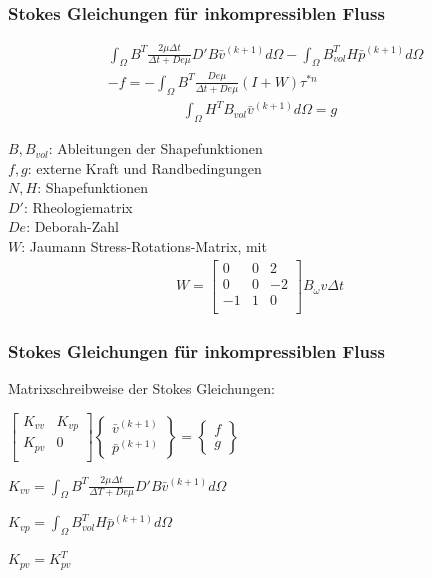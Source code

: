 \documentclass{beamer}
\begin{document}
\begin{frame}
	\frametitle{Stokes Gleichungen für inkompressiblen Fluss}
	\begin{small}
		\begin{align*}
			&\int_{\Omega} B^T \frac{2\mu \Delta t}{\Delta t + De\mu} D' B \bar{v}^{(k+1)} d\Omega -  \int_{\Omega} B^T_{vol} H \bar{p}^{(k+1)} d\Omega \\ 
			&-f  = -\int_{\Omega} B^T \frac{De\mu}{\Delta t + De\mu}(I+W)\tau^{*n}
		\end{align*}
		\begin{align*}
			\int_{\Omega} H^T B_{vol}  \bar{v}^{(k+1)} d\Omega = g
		\end{align*}
		
	$B, B_{vol}$: Ableitungen der Shapefunktionen \\
	$f, g$: externe Kraft und Randbedingungen \\
	$N,H$: Shapefunktionen\\
	$D'$: Rheologiematrix \\
	$De$: Deborah-Zahl \\
	$W$: Jaumann Stress-Rotations-Matrix, mit 
	\begin{align*}
		W = 	\begin{bmatrix}
				0 & 0 & 2 \\
				0 & 0 & -2 \\
				-1 & 1 & 0 \\
				\end{bmatrix}
				B_{\omega} v \Delta t
	\end{align*}
	\end{small}
\end{frame}

\begin{frame}
\frametitle{Stokes Gleichungen für inkompressiblen Fluss}
Matrixschreibweise der Stokes Gleichungen: \\
\par\medskip
$\begin{bmatrix}
K_{vv} & K_{vp} \\
K_{pv} & 0 \\
\end{bmatrix}
\begin{Bmatrix}
\bar{v}^{(k+1)} \\
\bar{p}^{(k+1)}
\end{Bmatrix}
= \begin{Bmatrix}
f \\
g
\end{Bmatrix}$
\par\bigskip
$K_{vv} = \int_{\Omega} B^T \frac{2\mu \Delta t}{\Delta T + De\mu} D' B \bar{v}^{(k+1)} d\Omega$ \\
\par\smallskip
$K_{vp} = \int_{\Omega} B^T_{vol} H \bar{p}^{(k+1)} d\Omega $ \\
\par\smallskip
$K_{pv} = K_{pv}^T$
\end{frame}
\end{document}
